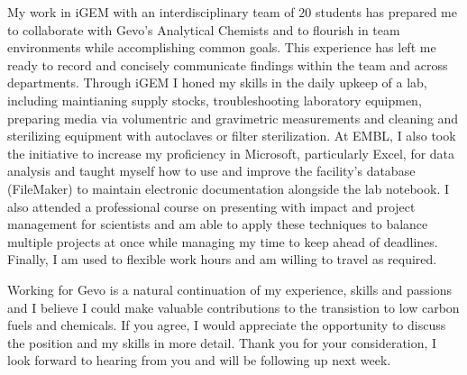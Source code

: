\documentclass[11pt,a4paper,sans]{moderncv}
\begin{document}
\begin{spacing}{1.1}
My work in iGEM with an interdisciplinary team of 20 students has prepared me to collaborate with Gevo's Analytical Chemists and to flourish in team environments while accomplishing common goals. This experience has left me ready to record and concisely communicate findings within the team and across departments. Through iGEM I honed my skills in the daily upkeep of a lab, including maintianing supply stocks, troubleshooting laboratory equipmen, preparing media via volumentric and gravimetric measurements and cleaning and sterilizing equipment with autoclaves or filter sterilization. At EMBL, I also took the initiative to increase my proficiency in Microsoft, particularly Excel, for data analysis and taught myself how to use and improve the facility's database (FileMaker) to maintain electronic documentation alongside the lab notebook. I also attended a professional course on presenting with impact and project management for scientists and am able to apply these techniques to balance multiple projects at once while managing my time to keep ahead of deadlines. Finally, I am used to flexible work hours and am willing to travel as required. \par\vspace*{1.5mm}

Working for Gevo is a natural continuation of my experience, skills and passions and I believe I could make valuable contributions to the transistion to low carbon fuels and chemicals. If you agree, I would appreciate the opportunity to discuss the position and my skills in more detail. Thank you for your consideration, I look forward to hearing from you and will be following up next week.

\end{spacing}
\vspace*{2mm} 
\makeletterclosing
\end{document}
